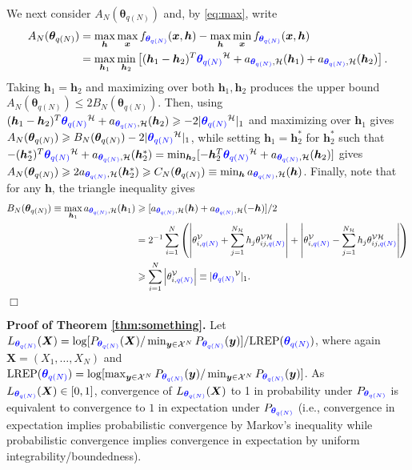 \documentclass[numbib]{imamat}
\theoremstyle{theorem}
\theoremstyle{lemma}
\theoremstyle{example}
\theoremstyle{corollary}
\theoremstyle{definition}
\theoremstyle{remark}
\theoremstyle{approximation}
\theoremstyle{scheme}
\newcommand{\REP}{\mathrm{LREP}}
\newcommand{\thetaidx}{q(N)}
\newcommand{\thetaN}{\boldsymbol \theta_{\thetaidx}}
\newcommand{\elt}{A_{N}(\thetaN) }
\newcommand{\Gam}{B_{N}(\thetaN) }
\newcommand{\Gamc}{C_{N}(\thetaN) }
\newcommand{\ak}[1]{{\color{blue} #1}}
\begin{document}
We next consider \(\elt\) and, by \eqref{eq:max}, write
\begin{align*}
\elt &=  \max_{\boldsymbol h}\max_{\boldsymbol x}f_{\ak{\thetaN}} (\boldsymbol x , \boldsymbol h) -  \max_{\boldsymbol h}\min_{\boldsymbol x}f_{\ak{\thetaN}} (\boldsymbol x , \boldsymbol h)\\
&= \max_{\boldsymbol h_1} \min_{\boldsymbol h_2 }\left[ (\boldsymbol h_1 - \boldsymbol h_2)^T \ak{\thetaN}^{\mathcal{H}} + a_{\ak{\thetaN}, \mathcal{H}} (\boldsymbol h_1)  + a_{\ak{\thetaN}, \mathcal{H}} (\boldsymbol h_2)\right].
\end{align*}
Taking \(\boldsymbol h_1=\boldsymbol h_2\) and maximizing over both \(\boldsymbol h_1,\boldsymbol h_2\) produces the upper bound \(\elt \leq 2\Gam\). Then, using \((\boldsymbol h_1 - \boldsymbol h_2)^T \ak{\thetaN}^{\mathcal{H}} + a_{\ak{\thetaN}, \mathcal{H}} (\boldsymbol h_2) \geq - 2|\ak{\thetaN}^{\mathcal{H}} |_1\) and maximizing over \(\boldsymbol h_1\) gives \(\elt \geq \Gam- 2|\ak{\thetaN}^{\mathcal{H}} |_1\), while setting \(\boldsymbol h_1=\boldsymbol h_2^*\) for \(\boldsymbol h_2^*\) such that \(-(\boldsymbol h_2^*) ^T \ak{\thetaN}^{\mathcal{H}} + a_{\ak{\thetaN}, \mathcal{H}} (\boldsymbol h_2^*) = \min_{\boldsymbol h_2} [-\boldsymbol h_2^T \ak{\thetaN}^{\mathcal{H}} + a_{\ak{\thetaN}, \mathcal{H}} (\boldsymbol h_2)]\) gives \(\elt \geq 2 a_{\ak{\thetaN}, \mathcal{H}} (\boldsymbol h_2^*) \geq \Gamc \equiv \min_{\boldsymbol h} a_{ \ak{\thetaN}, \mathcal{H}} (\boldsymbol h)\). Finally, note that for any \(\boldsymbol h\), the triangle inequality gives
\begin{align*}
\Gam  \equiv \max_{\boldsymbol h_1}  a_{\ak{\thetaN}, \mathcal{H}} (\boldsymbol h_1) &\geq
[a_{\ak{\thetaN}, \mathcal{H}} (\boldsymbol h)  + a_{\ak{\thetaN}, \mathcal{H}} (-\boldsymbol h)]/2 \\
&=
2^{-1}\sum_{i=1}^{N } \left(\left| \theta_{i,\ak{\thetaidx}}^{\mathcal{V}}   + \sum_{j=1}^{N_{\mathcal{H}}} h_j \theta_{ij,\ak{\thetaidx}}^{\mathcal{VH}} \right|
+ \left| \theta_{i,\ak{\thetaidx}}^{\mathcal{V}}   - \sum_{j=1}^{N_{\mathcal{H}}} h_j \theta_{ij,\ak{\thetaidx}}^{\mathcal{VH}} \right|\right)\\
& \geq \sum_{i=1}^{N }  \left| \theta_{i,\ak{\thetaidx}}^{\mathcal{V}} \right| \equiv | \ak{\thetaN}^{\mathcal{V}}|_1.
\end{align*}
\hfill \(\Box\)

\textbf{Proof of Theorem \ref{thm:something}.} Let \(L_{\ak{\thetaN}}(\boldsymbol X) = \log[ P_{ \ak{\thetaN}}(\boldsymbol X)/ \min_{\boldsymbol y \in \mathcal{X}^N} P_{\ak{\thetaN}}(\boldsymbol y) ]/\REP(\ak{\thetaN})\), where again \(\boldsymbol X=(X_1, \dots, X_N)\) and \(\REP(\ak{\thetaN})= \log[\max_{\boldsymbol y \in \mathcal{X}^N} P_{\ak{\thetaN}}(\boldsymbol y)/ \min_{\boldsymbol y \in \mathcal{X}^N} P_{ \ak{\thetaN}}(\boldsymbol y) ]\). As \(L_{\ak{\thetaN}}(\boldsymbol X)\in[0,1]\), convergence of \(L_{ \ak{\thetaN}}(\boldsymbol X)\) to 1 in probability under \(P_{\ak{\thetaN}}\) is equivalent to convergence to \(1\) in expectation under \(P_{\ak{\thetaN}}\) (i.e., convergence in expectation implies probabilistic convergence by Markov's inequality while probabilistic convergence implies convergence in expectation by uniform integrability/boundedness).
\end{document}
